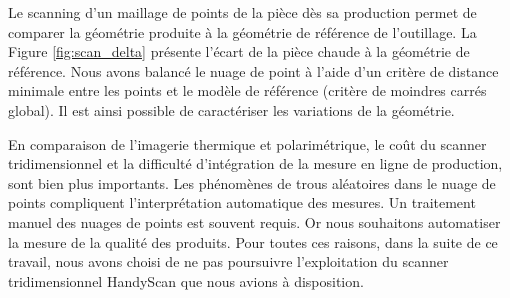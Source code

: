 Le scanning d'un maillage de points de la pièce dès sa production permet de comparer la géométrie produite à la géométrie de référence de l'outillage.
La Figure \ref{fig:scan_delta} présente l'écart de la pièce chaude à la géométrie de référence.
Nous avons balancé le nuage de point à l'aide d'un critère de distance minimale entre les points et le modèle de référence (critère de moindres carrés global).
Il est ainsi possible de caractériser les variations de la géométrie.

En comparaison de l'imagerie thermique et polarimétrique, le coût du scanner tridimensionnel et la difficulté d'intégration de la mesure en ligne de production, sont bien plus importants.
Les phénomènes de trous aléatoires dans le nuage de points compliquent l'interprétation automatique des mesures.
Un traitement manuel des nuages de points est souvent requis.
Or nous souhaitons automatiser la mesure de la qualité des produits.
Pour toutes ces raisons, dans la suite de ce travail, nous avons choisi de ne pas poursuivre l'exploitation du scanner tridimensionnel HandyScan que nous avions à disposition.

